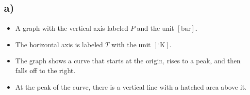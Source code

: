 

\subsection*{a)}

\begin{itemize}
    \item A graph with the vertical axis labeled \( P \) and the unit \([ \text{bar} ]\).
    \item The horizontal axis is labeled \( T \) with the unit \([ ^\circ \text{K} ]\).
    \item The graph shows a curve that starts at the origin, rises to a peak, and then falls off to the right.
    \item At the peak of the curve, there is a vertical line with a hatched area above it.
\end{itemize}